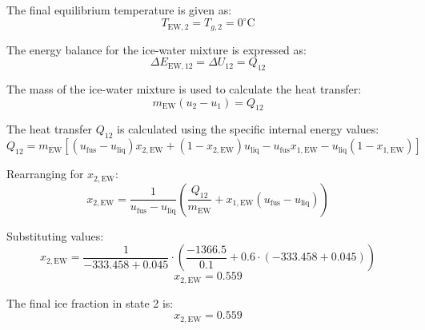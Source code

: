 The final equilibrium temperature is given as:  
\[
T_{\text{EW},2} = T_{g,2} = 0^\circ \text{C}
\]  

The energy balance for the ice-water mixture is expressed as:  
\[
\Delta E_{\text{EW},12} = \Delta U_{12} = Q_{12}
\]  

The mass of the ice-water mixture is used to calculate the heat transfer:  
\[
m_{\text{EW}} (u_2 - u_1) = Q_{12}
\]  

The heat transfer \( Q_{12} \) is calculated using the specific internal energy values:  
\[
Q_{12} = m_{\text{EW}} \left[ (u_{\text{fus}} - u_{\text{liq}}) x_{2,\text{EW}} + (1 - x_{2,\text{EW}}) u_{\text{liq}} - u_{\text{fus}} x_{1,\text{EW}} - u_{\text{liq}} (1 - x_{1,\text{EW}}) \right]
\]  

Rearranging for \( x_{2,\text{EW}} \):  
\[
x_{2,\text{EW}} = \frac{1}{u_{\text{fus}} - u_{\text{liq}}} \left( \frac{Q_{12}}{m_{\text{EW}}} + x_{1,\text{EW}} (u_{\text{fus}} - u_{\text{liq}}) \right)
\]  

Substituting values:  
\[
x_{2,\text{EW}} = \frac{1}{-333.458 + 0.045} \cdot \left( \frac{-1366.5}{0.1} + 0.6 \cdot (-333.458 + 0.045) \right)
\]  
\[
x_{2,\text{EW}} = 0.559
\]  

The final ice fraction in state 2 is:  
\[
x_{2,\text{EW}} = 0.559
\]